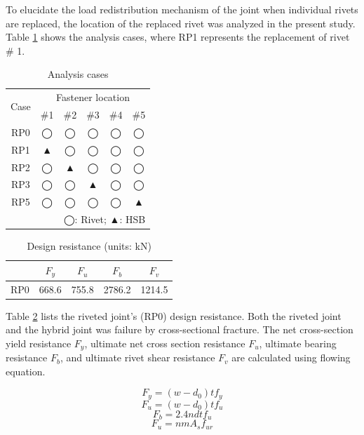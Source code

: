 To elucidate the load redistribution mechanism of the joint when individual rivets are replaced, the location of the replaced rivet was analyzed in the present study. Table \ref{tab-l2} shows the analysis cases, where RP1 represents the replacement of rivet \# 1.

\begin{table}[htbp]
\centering
\caption{Analysis cases}\label{tab-l2}
\begin{tabular}{@{}cccccc@{}}
\toprule
\multirow{2}{*}{Case} & \multicolumn{5}{c}{Fastener location} \\ \cmidrule(l){2-6} 
                      & \#1   & \#2   & \#3   & \#4   & \#5   \\ \midrule
RP0                   & ◯     & ◯     & ◯     & ◯     & ◯     \\
RP1                   & ▲     & ◯     & ◯     & ◯     & ◯     \\
RP2                   & ◯     & ▲     & ◯     & ◯     & ◯     \\
RP3                   & ◯     & ◯     & ▲     & ◯     & ◯     \\
RP5                   & ◯     & ◯     & ◯     & ◯     & ▲     \\ \midrule
\multicolumn{6}{r}{◯: Rivet; ▲: HSB}                         
\end{tabular}
\end{table}

\begin{table}[htbp]
\centering
\caption{Design resistance (units: kN)}\label{tab-l3}
\begin{tabular}{@{}ccccc@{}}
\toprule
    & $F_{y}$ & $F_{u}$ & $F_{b}$ & $F_{v}$ \\ \midrule
RP0 & 668.6       & 755.8     & 2786.2   & 1214.5   \\ \bottomrule
\end{tabular}
\end{table}

Table \ref{tab-l3} lists the riveted joint's (RP0) design resistance. Both the riveted joint and the hybrid joint was failure by cross-sectional fracture. The net cross-section yield resistance $F_{y}$, ultimate net cross section resistance $F_{u}$, ultimate bearing resistance $F_{b}$, and ultimate rivet shear resistance $F_v$ are calculated using flowing equation.

\begin{equation*}
    F_y = (w-d_0)tf_y
\end{equation*}
\begin{equation*}
    F_u = (w-d_0)tf_u
\end{equation*}
\begin{equation*}
    F_b = 2.4ndtf_u
\end{equation*}
\begin{equation*}
    F_u = nmA_sf_{ur}
\end{equation*}

